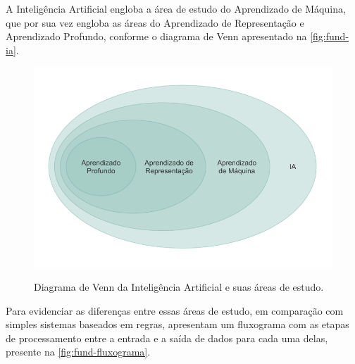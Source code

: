 A Inteligência Artificial engloba a área de estudo do Aprendizado de Máquina, que por sua vez engloba as áreas do Aprendizado de Representação e Aprendizado Profundo, conforme o diagrama de Venn apresentado na \autoref{fig:fund-ia}.

\begin{figure}[h!] %
  \centering
  \caption{Diagrama de Venn da Inteligência Artificial e suas áreas de estudo. }
  \includegraphics[scale=1.1]{img/img-fundamentacao-ia.pdf}
  \label{fig:fund-ia}
\end{figure}

Para evidenciar as diferenças entre essas áreas de estudo, em comparação com simples sistemas baseados em regras,  apresentam um fluxograma com as etapas de processamento entre a entrada e a saída de dados para cada uma delas, presente na \autoref{fig:fund-fluxograma}.

